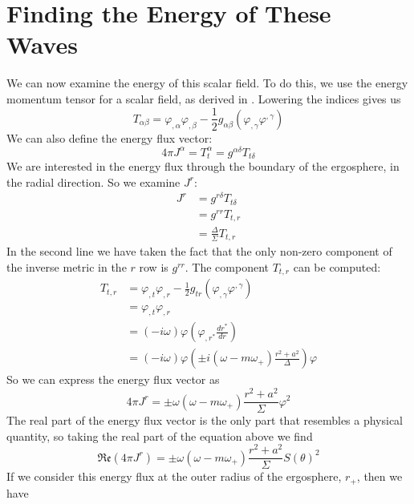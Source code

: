 \documentclass[11pt]{article}
\numberwithin{equation}{section}
\numberwithin{figure}{section}
\numberwithin{table}{section}
\begin{document}
\section{Finding the Energy of These Waves}
\par We can now examine the energy of this scalar field. To do this, we use the energy momentum tensor for a scalar field, as derived in \cite[eqn. 4]{energy momentum}. Lowering the indices gives us
\begin{equation}
    T_{\alpha\beta}=\varphi_{,\alpha}\varphi_{,\beta}-\frac{1}{2}g_{\alpha\beta}(\varphi_{,\gamma}\varphi^{,\gamma})
    \label{eqn:energy momentum}
\end{equation}
We can also define the energy flux vector:
\begin{equation}
    4\pi J^\alpha=T_t^\alpha=g^{\alpha\delta}T_{t\delta}
    \label{eqn:energy flux}
\end{equation}
We are interested in the energy flux through the boundary of the ergosphere, in the radial direction. So we examine $J^r$:
\begin{align*}
    J^r&=g^{r\delta}T_{t\delta}\\
    &=g^{rr}T_{t,r}\\
    &=\frac{\Delta}{\Sigma}T_{t,r}
\end{align*}
In the second line we have taken the fact that the only non-zero component of the inverse metric in the $r$ row is $g^{rr}$. The component $T_{t,r}$ can be computed:
\begin{align*}
    T_{t,r}&=\varphi_{,t}\varphi_{,r}-\frac{1}{2}g_{tr}(\varphi_{,\gamma}\varphi^{,\gamma})\\
    &=\varphi_{,t}\varphi_{,r}\\
    &=(-i\omega)\varphi(\varphi_{,r^*}\frac{dr^*}{dr})\\
    &=(-i\omega)\varphi\left(\pm i(\omega-m\omega_+)\frac{r^2+a^2}{\Delta}\right)\varphi
\end{align*}
So we can express the energy flux vector as
\begin{equation*}
    4\pi J^r=\pm\omega(\omega-m\omega_+)\frac{r^2+a^2}{\Sigma}\varphi^2
\end{equation*}
The real part of the energy flux vector is the only part that resembles a physical quantity, so taking the real part of the equation above we find
\begin{equation*}
    \mathfrak{Re}(4\pi J^r)=\pm\omega(\omega-m\omega_+)\frac{r^2+a^2}{\Sigma}S(\theta)^2
\end{equation*}
If we consider this energy flux at the outer radius of the ergosphere, $r_+$, then we have 
\end{document}
